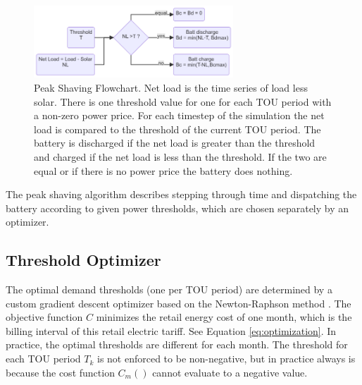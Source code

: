 \documentclass[journal,article,submit,pdftex,moreauthors]{Definitions/mdpi}
\begin{document}
\begin{figure}
  \centering
  \includegraphics[width=7.5cm]{./images/peak shaving flowchart.png}
  \caption{Peak Shaving Flowchart. Net load is the time series of load less solar. There is one threshold value for one for each TOU period with a non-zero power price. For each timestep of the simulation the net load is compared to the threshold of the current TOU period. The battery is discharged if the net load is greater than the threshold and charged if the net load is less than the threshold. If the two are equal or if there is no power price the battery does nothing.}
  \label{fig:peakshaving-flowchart}
\end{figure}

The peak shaving algorithm describes stepping through time and dispatching the battery according to given power thresholds, which are chosen separately by an optimizer.

\subsection{Threshold Optimizer}\label{threshold-optimizer}%

The optimal demand thresholds (one per TOU period) are determined by a custom gradient descent optimizer based on the Newton-Raphson method \cite{Truong2019}. The objective function \(C\) minimizes the retail energy cost of one month, which is the billing interval of this retail electric tariff. See Equation \ref{eq:optimization}. In practice, the optimal thresholds are different for each month. The threshold for each TOU period \(T_k\) is not enforced to be non-negative, but in practice always is because the cost function \(C_m()\) cannot evaluate to a negative value.
\end{document}
